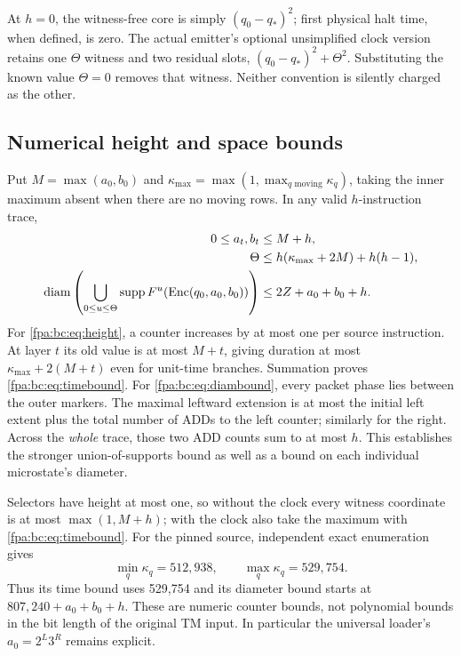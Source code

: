 \documentclass[11pt,a4paper]{article}
\numberwithin{equation}{section}
\newcommand{\supp}{\operatorname{supp}}\newcommand{\Swap}{\operatorname{Swap}}
\begin{document}
At $h=0$, the witness-free core is simply $(q_0-q_*)^2$; first physical halt
time, when defined, is zero. The actual emitter's optional unsimplified clock
version retains one $\Theta$ witness and two residual slots,
$(q_0-q_*)^2+\Theta^2$. Substituting the known value $\Theta=0$ removes that
witness. Neither convention is silently charged as the other.

\subsection{Numerical height and space bounds}\label{fpa:bc:sec:bounds}
Put $M=\max(a_0,b_0)$ and
$\kappa_{\max}=\max(1,\max_{q\text{ moving}}\kappa_q)$, taking the inner
maximum absent when there are no moving rows. In any valid $h$-instruction
trace,
\begin{align}
 0\le a_t,b_t&\le M+h,\label{fpa:bc:eq:height}\\
 \Theta&\le h(\kappa_{\max}+2M)+h(h-1),\label{fpa:bc:eq:timebound}\\
 \diam\left(\bigcup_{0\le u\le\Theta}\supp F^u(\Enc(q_0,a_0,b_0))\right)
 &\le2Z+a_0+b_0+h.\label{fpa:bc:eq:diambound}
\end{align}
For \eqref{fpa:bc:eq:height}, a counter increases by at most one per source instruction.
At layer $t$ its old value is at most $M+t$, giving duration at most
$\kappa_{\max}+2(M+t)$ even for unit-time branches. Summation proves
\eqref{fpa:bc:eq:timebound}. For \eqref{fpa:bc:eq:diambound}, every packet phase lies between
the outer markers. The maximal leftward extension is at most the initial
left extent plus the total number of ADDs to the left counter; similarly for
the right. Across the \emph{whole} trace, those two ADD counts sum to at most
$h$. This establishes the stronger union-of-supports bound as well as a bound
on each individual microstate's diameter.

Selectors have height at most one, so without the clock every witness coordinate
is at most $\max(1,M+h)$; with the clock also take the maximum with
\eqref{fpa:bc:eq:timebound}. For the pinned source, independent exact enumeration gives
\[
 \min_q\kappa_q=512,938,\qquad\max_q\kappa_q=529,754.
\]
Thus its time bound uses 529,754 and its diameter bound starts at
$807,240+a_0+b_0+h$. These are numeric counter bounds, not polynomial bounds
in the bit length of the original TM input. In particular the universal
loader's $a_0=2^L3^R$ remains explicit.
\end{document}
